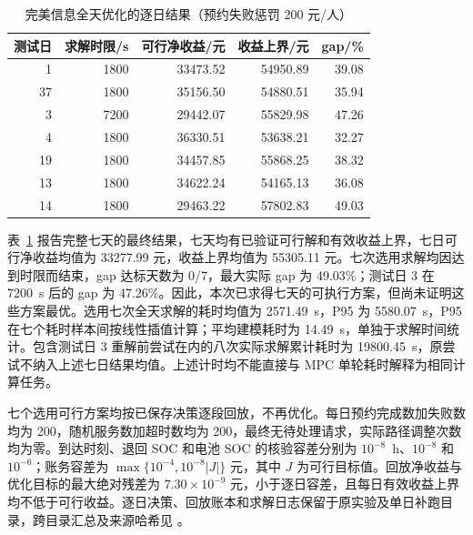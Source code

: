 \begin{table}[!htbp]
  \centering
  \caption{完美信息全天优化的逐日结果（预约失败惩罚 200 元/人）}
  \label{exp:perfect_information_daily}
  \small
  \begin{tabular}{@{}rrrrr@{}}
    \toprule
    测试日 & 求解时限/s & 可行净收益/元 & 收益上界/元 & gap/\% \\
    \midrule
    1  & 1800 & 33473.52 & 54950.89 & 39.08 \\
    37 & 1800 & 35156.50 & 54880.51 & 35.94 \\
    3  & 7200 & 29442.07 & 55829.98 & 47.26 \\
    4  & 1800 & 36330.51 & 53638.21 & 32.27 \\
    19 & 1800 & 34457.85 & 55868.25 & 38.32 \\
    13 & 1800 & 34622.24 & 54165.13 & 36.08 \\
    14 & 1800 & 29463.22 & 57802.83 & 49.03 \\
    \bottomrule
  \end{tabular}
\end{table}

表~\ref{exp:perfect_information_daily} 报告完整七天的最终结果，七天均有已验证可行解和有效收益上界，七日可行净收益均值为 33277.99 元，收益上界均值为 55305.11 元。七次选用求解均因达到时限而结束，gap 达标天数为 0/7，最大实际 gap 为 49.03\%；测试日 3 在 7200~s 后的 gap 为 47.26\%。因此，本次已求得七天的可执行方案，但尚未证明这些方案最优。选用七次全天求解的耗时均值为 2571.49~s，P95 为 5580.07~s，P95 在七个耗时样本间按线性插值计算；平均建模耗时为 14.49~s，单独于求解时间统计。包含测试日 3 重解前尝试在内的八次实际求解累计耗时为 19800.45~s，原尝试不纳入上述七日结果均值。上述计时均不能直接与 MPC 单轮耗时解释为相同计算任务。

七个选用可行方案均按已保存决策逐段回放，不再优化。每日预约完成数加失败数均为 200，随机服务数加超时数均为 200，最终无待处理请求，实际路径调整次数均为零。到达时刻、退回 SOC 和电池 SOC 的核验容差分别为 $10^{-8}$~h、$10^{-8}$ 和 $10^{-6}$；账务容差为 $\max\{10^{-4},10^{-8}|J|\}$ 元，其中 $J$ 为可行目标值。回放净收益与优化目标的最大绝对残差为 $7.30\times10^{-9}$ 元，小于逐日容差，且每日有效收益上界均不低于可行收益。逐日决策、回放账本和求解日志保留于原实验及单日补跑目录，跨目录汇总及来源哈希见 。

